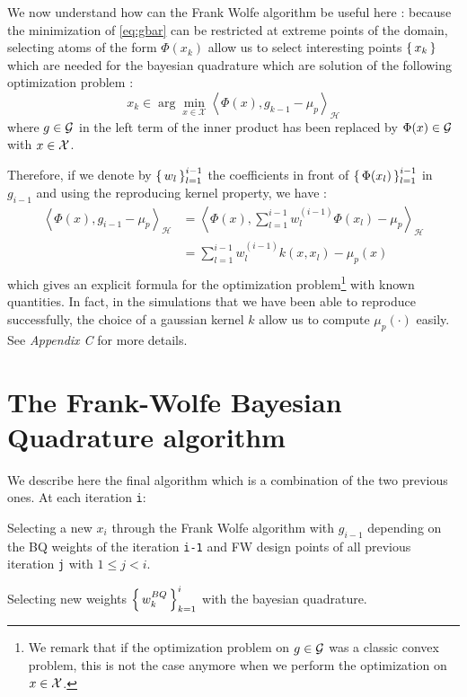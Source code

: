  We now understand how can the Frank Wolfe algorithm be useful here : because the
 minimization of \eqref{eq:gbar} can be restricted at extreme points of the domain,
 selecting atoms of the form $\Phi(x_k)$ allow us to select interesting points $\left \{ \, x_k \, \right \}$ which are needed for the bayesian quadrature which are solution of the
 following optimization problem :
 \begin{equation}
   x_k \in \arg \min _ { x \in \mathcal { X } } \left\langle \Phi ( x ) , g _ { k - 1 } - \mu _ { p } \right\rangle _ { \mathcal { H } }
 \end{equation}
 where $g \in \mathcal{G}$ in the left term of the inner product has been replaced by $\Phi(x) \in \mathcal{G}$ with $x \in \mathcal{X}$.

 Therefore, if we denote by $\left \{ \, w_l \, \right \}_{l=1}^{i-1}$ the coefficients in front of
 $\left \{ \, \Phi(x_l) \, \right \}_{l=1}^{i-1}$ in $g_{i-1}$ and using the reproducing kernel property, we have :
 \begin{align*}
   \left\langle \Phi ( x ) , g _ { i - 1 } - \mu _ { p } \right\rangle _ { \mathcal { H } } &= \left\langle \Phi ( x ) , \sum _ { l = 1 } ^ { i - 1 } w _ { l } ^ { ( i - 1 ) } \Phi \left( x _ { l } \right) - \mu _ { p } \right\rangle _ { \mathcal { H } }\\
   &= \sum _ { l = 1 } ^ { i - 1 } w _ { l } ^ { ( i - 1 ) } k \left( x , x _ { l } \right) - \mu _ { p } ( x )\\
 \end{align*}
which gives an explicit formula for the optimization problem\footnote{We remark that if
 the optimization problem on $g \in \mathcal{G}$ was a classic convex problem, this is not the case anymore when we perform the optimization on $x \in \mathcal{X}$.} with known quantities.
 In fact, in the simulations that we have been able to reproduce successfully, the choice of a gaussian kernel $k$ allow us to compute $\mu_p( \cdot )$ easily. See \cite{FWBQ} \textit{Appendix C} for more details.
 \section{The Frank-Wolfe Bayesian Quadrature algorithm}
 \label{sec:CC}

We describe here the final algorithm which is a combination of the two previous
 ones.
    At each iteration \texttt{i}:
 \begin{mydescription}
   \item [Selecting a new $x_i$] through the Frank Wolfe algorithm with $g_{i-1}$ depending
   on the BQ weights of the iteration \texttt{i-1} and FW design points of all previous iteration \texttt{j} with $1 \leq j<i$.
   \item [Selecting new weights $\left \{ \, w_k^{BQ} \, \right \}_{k=1}^i$] with the bayesian quadrature.
 \end{mydescription}


